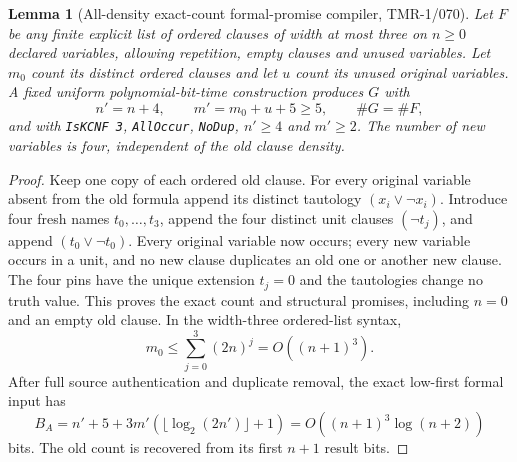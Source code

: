 \documentclass[11pt]{article}
\newtheorem{lemma}{Lemma}
\begin{document}
\begin{lemma}[All-density exact-count formal-promise compiler, TMR-1/070]
Let $F$ be any finite explicit list of ordered clauses of width at most
three on $n\ge0$ declared variables, allowing repetition, empty clauses
and unused variables. Let $m_0$ count its distinct \emph{ordered}
clauses and let $u$ count its unused original variables.
A fixed uniform polynomial-bit-time construction produces $G$ with
\[
 n'=n+4,\qquad m'=m_0+u+5\ge5,\qquad
 \#G=\#F,
\]
and with \texttt{IsKCNF 3}, \texttt{AllOccur}, \texttt{NoDup},
$n'\ge4$ and $m'\ge2$. The number of new variables is four,
\emph{independent of the old clause density}.
\end{lemma}
\begin{proof}
Keep one copy of each ordered old clause. For every original variable
absent from the old formula append its distinct tautology
$(x_i\lor\neg x_i)$. Introduce four fresh names $t_0,\ldots,t_3$,
append the four distinct unit clauses $(\neg t_j)$, and append
$(t_0\lor\neg t_0)$. Every original variable now occurs; every new
variable occurs in a unit, and no new clause duplicates an old one
or another new clause. The four pins have the unique extension
$t_j=0$ and the tautologies change no truth value. This proves the
exact count and structural promises, including $n=0$ and an empty
old clause. In the width-three ordered-list syntax,
\[
 m_0\le\sum_{j=0}^{3}(2n)^j=O((n+1)^3).
\]
After full source authentication and duplicate removal, the exact
low-first formal input has
\[
 B_A=n'+5+3m'(\lfloor\log_2(2n')\rfloor+1)
 =O((n+1)^3\log(n+2))
\]
bits. The old count is recovered from its first $n+1$ result bits.
\end{proof}
\end{document}
